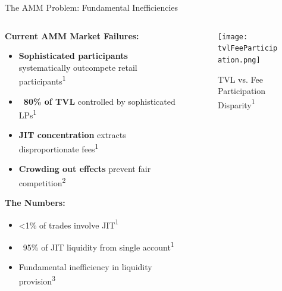 \documentclass[aspectratio=169]{beamer}
\newcommand{\citeaquilina}{\textcolor{parityblue}{\textsuperscript{1}}}
\newcommand{\citecapponi}{\textcolor{paritygreen}{\textsuperscript{2}}}
\newcommand{\citema}{\textcolor{parityorange}{\textsuperscript{3}}}
\begin{document}
\begin{frame}{The AMM Problem: Fundamental Inefficiencies}
    \begin{columns}
        \begin{column}{0.55\textwidth}
            \textbf{Current AMM Market Failures:}
            \begin{itemize}
                \item \textcolor{parityred}{\textbf{Sophisticated participants}} systematically outcompete retail participants\citeaquilina
                \item \textcolor{parityred}{\textbf{~80\% of TVL}} controlled by sophisticated LPs\citeaquilina
                \item \textcolor{parityred}{\textbf{JIT concentration}} extracts disproportionate fees\citeaquilina
                \item \textcolor{parityred}{\textbf{Crowding out effects}} prevent fair competition\citecapponi
            \end{itemize}
            
            \vspace{0.5cm}
            \textbf{The Numbers:}
            \begin{itemize}
                \item \textcolor{parityred}{<1\%} of trades involve JIT\citeaquilina
                \item \textcolor{parityred}{~95\%} of JIT liquidity from single account\citeaquilina
                \item \textcolor{parityred}{Fundamental inefficiency} in liquidity provision\citema
            \end{itemize}
        \end{column}
        \begin{column}{0.45\textwidth}
        \begin{figure}
            \centering
            \texttt{[image: tvlFeeParticipation.png]} %
            \caption{TVL vs. Fee Participation Disparity\citeaquilina}
            \label{fig:tvl_fee_disparity}
        \end{figure}
        \end{column}
    \end{columns}
\end{frame}
\end{document}
